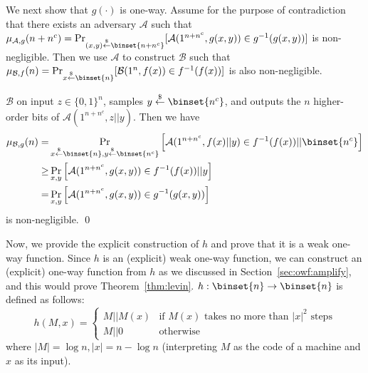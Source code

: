 \documentclass[12pt]{tufte-book}
\begin{document}
We next show that $g(\cdot)$ is one-way.
Assume for the purpose of contradiction that there exists an adversary $\mathcal{A}$ such that $\mu_{\mathcal{A},g}(n+n^c) = \Pr_{(x,y) \stackrel{\$}{\leftarrow} \binset{n+n^c}}[ \mathcal{A}(1^{n+n^c}, g(x,y)) \in g^{-1}(g(x,y))]$ is non-negligible. Then we use $\mathcal{A}$ to construct $\mathcal{B}$ such that $\mu_{\mathcal{B},f}(n) = \Pr_{x \stackrel{\$}{\leftarrow} \binset{n}}[ \mathcal{B}(1^n, f(x)) \in f^{-1}(f(x))]$ is also non-negligible.

$\mathcal{B}$ on input $z \in\{0,1\}^n$, samples $y \stackrel{\$}{\leftarrow} \binset{n^c}$, and outputs the $n$ higher-order bits of  $\mathcal{A}(1^{n+n^c}, z||y)$. Then we have
\begin{align*}
\mu_{\mathcal{B},g}(n) =& \Pr_{x \stackrel{\$}{\leftarrow} \binset{n}, y \stackrel{\$}{\leftarrow} \binset{n^c}}\left[\mathcal{A}(1^{n+n^c}, f(x) || y) \in f^{-1}(f(x)) || \binset{n^c}\right]\\
\geq&\Pr_{x,y}\left[\mathcal{A}(1^{n+n^c}, g(x,y)) \in f^{-1}(f(x)) || y\right]\\
=& \Pr_{x,y}\left[\mathcal{A}(1^{n+n^c}, g(x,y)) \in g^{-1}(g(x,y))\right]
\end{align*}
is non-negligible.
\qed

\bigskip
Now, we provide the explicit construction of $h$ and prove that it is a weak one-way function.
Since $h$ is an (explicit) weak one-way function, we can construct an (explicit) one-way function from $h$ as we discussed in Section~\ref{sec:owf:amplify}, and this would prove Theorem~\ref{thm:levin}.
$h: \binset{n} \rightarrow \binset{n}$ is defined as follows:
$$
h(M,x) = \left\{
\begin{array}{ll}
M || M(x) & \text{if $M(x)$ takes no more than $|x|^2$ steps} \\
M || 0 & \text{otherwise}
\end{array}
\right.
$$
where $|M| = \log n, |x| = n - \log n$ (interpreting $M$ as the code of a machine  and $x$ as its input).
\end{document}
